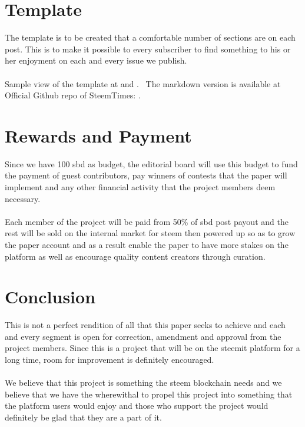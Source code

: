 \documentclass[a4paper,12pt]{article}
\newcommand{\lnk}[3][blue]{\href{#2}{\color{#1}{#3}}}%
\begin{document}
\section {Template}

The template is to be created that a comfortable number of sections are on each post. This is to make it possible to every subscriber to find something to his or her enjoyment on each and every issue we publish. 
\\\\
Sample view of the template at \lnk{https://steemit.com/esteem/@johnsonlai/say-no-more-to-microsoft-word-fe73aa1ca8232}{steemit} and \lnk{https://busy.org/esteem/@johnsonlai/say-no-more-to-microsoft-word-fe73aa1ca8232}{busy.org}. \
The markdown version is available at Official Github repo of SteemTimes: \lnk{https://github.com/superoo7/SteemTimes/blame/master/format.md}{format.md}.

\section {Rewards and Payment}

Since we have 100 sbd as budget, the editorial board will use this budget to fund the payment of guest contributors, pay winners of contests that the paper will implement and any other financial activity that the project members deem necessary.
\\\\
Each member of the project will be paid from 50\% of sbd post payout and the rest will be sold on the internal market for steem then powered up so as to grow the paper account and as a result enable the paper to have more stakes on the platform as well as encourage quality content creators through curation.

\section{Conclusion}

This is not a perfect rendition of all that this paper seeks to achieve and each and every segment is open for correction, amendment and approval from the project members. Since this is a project that will be on the steemit platform for a long time, room for improvement is definitely encouraged. 
\\\\
We believe that this project is something the steem blockchain needs and we believe that we have the wherewithal to propel this project into something that the platform users would enjoy and those who support the project would definitely be glad that they are a part of it. 

\end{document}
